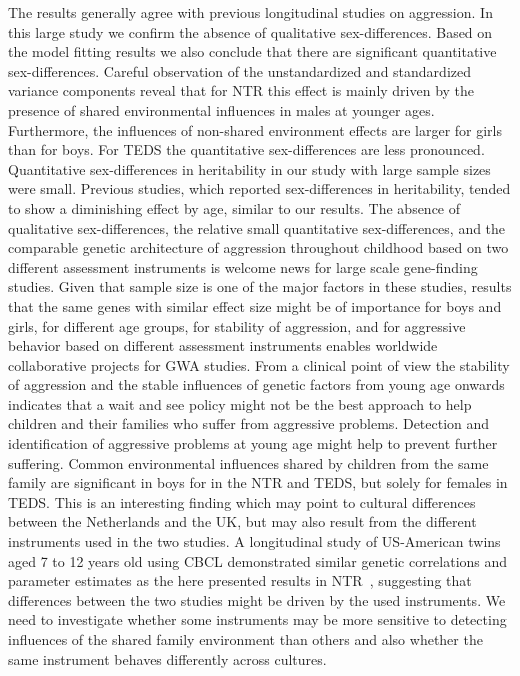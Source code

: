 The results generally agree with previous longitudinal studies on aggression.
In this large study we confirm the absence of qualitative sex-differences.
Based on the model fitting results we also conclude that there are significant quantitative sex-differences.
Careful observation of the unstandardized and standardized variance components reveal that for NTR this effect is mainly driven by the presence of shared environmental influences in males at younger ages.
Furthermore, the influences of non-shared environment effects are larger for girls than for boys.
For TEDS the quantitative sex-differences are less pronounced.
Quantitative sex-differences in heritability in our study with large sample sizes were small.
Previous studies, which reported sex-differences in heritability, tended to show a diminishing effect by age, similar to our results.
The absence of qualitative sex-differences, the relative small quantitative sex-differences, and the comparable genetic architecture of aggression throughout childhood based on two different assessment instruments is welcome news for large scale gene-finding studies.
Given that sample size is one of the major factors in these studies, results that the same genes with similar effect size might be of importance for boys and girls, for different age groups, for stability of aggression, and for aggressive behavior based on different assessment instruments enables worldwide collaborative projects for GWA studies. 
From a clinical point of view the stability of aggression and the stable influences of genetic factors from young age onwards indicates that a wait and see policy might not be the best approach to help children and their families who suffer from aggressive problems.
Detection and identification of aggressive problems at young age might help to prevent further suffering.
Common environmental influences shared by children from the same family are significant in boys for in the NTR and TEDS, but solely for females in TEDS.
This is an interesting finding which may point to cultural differences between the Netherlands and the UK, but may also result from the different instruments used in the two studies.
A longitudinal study of US-American twins aged 7 to 12 years old using CBCL demonstrated similar genetic correlations and parameter estimates as the here presented results in NTR~\cite{Haberstick2006}, suggesting that differences between the two studies might be driven by the used instruments.
We need to investigate whether some instruments may be more sensitive to detecting influences of the shared family environment than others and also whether the same instrument behaves differently across cultures.
